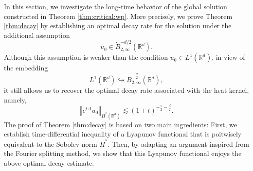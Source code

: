 \documentclass[11pt, leqno, a4paper,]{amsart}
\theoremstyle{remark}
\numberwithin{equation}{section}
\newcommand*{\norm}[1]{\left\Vert #1\right\Vert}
\begin{document}
  
  In this section, we investigate the long-time behavior of the global solution constructed in Theorem \ref{thm:critical:wp}. More precisely, we prove Theorem \ref{thm:decay} by establishing an optimal decay rate for the solution   under the additional assumption
  \begin{equation*}
  	u_0\in \dot{B}_{2,\infty}^{-d/2}(\mathbb{R}^d).
  \end{equation*}
Although this assumption is weaker than the condition $u_0\in L^1(\mathbb{R}^d)$, in view of the embedding
\begin{equation*}
	L^1(\mathbb{R}^d)\hookrightarrow \dot B_{2,\infty}^{- \frac{d}{2}}(\mathbb{R}^d),
\end{equation*}
it still allows us to recover the optimal decay rate associated with the heat kernel, namely,
\begin{equation*}
	\norm{  e^{t\Delta}u_0}_{ \dot H^s(\mathbb{R}^d)}
\lesssim (1+t)^{- \frac{s}{2} - \frac{d}{2}}.
\end{equation*}
The proof of Theorem \ref{thm:decay} is based on two main ingredients: First, we establish time-differential inequality of a Lyapunov functional     that is poitwisely equivalent to the Sobolev norm $ \dot H^s$. Then, by adapting an argument inspired from the Fourier splitting method, we show that this Lyapunov functional enjoys the above optimal decay estimate.
 

    
   
\end{document}
